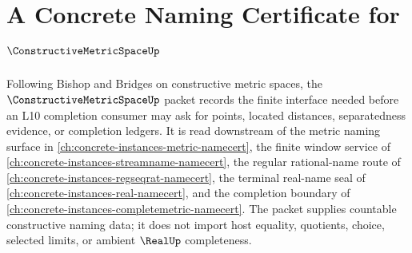 \chapter{A Concrete Naming Certificate for $\ConstructiveMetricSpaceUp$}
\label{ch:concrete-instances-constructive-metric-space-namecert}

Following Bishop and Bridges on constructive metric spaces, the $\ConstructiveMetricSpaceUp$ packet records the finite interface needed before an L10 completion consumer may ask for points, located distances, separatedness evidence, or completion ledgers. It is read downstream of the metric naming surface in \autoref{ch:concrete-instances-metric-namecert}, the finite window service of \autoref{ch:concrete-instances-streamname-namecert}, the regular rational-name route of \autoref{ch:concrete-instances-regseqrat-namecert}, the terminal real-name seal of \autoref{ch:concrete-instances-real-namecert}, and the completion boundary of \autoref{ch:concrete-instances-completemetric-namecert}. The packet supplies countable constructive naming data; it does not import host equality, quotients, choice, selected limits, or ambient $\RealUp$ completeness.

